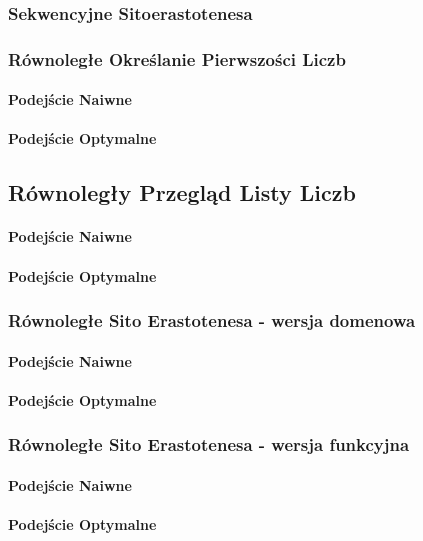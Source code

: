 \documentclass{article}
\begin{document}
            \subsubsection{Sekwencyjne Sitoerastotenesa}
            \subsubsection{Równoległe Określanie Pierwszości Liczb}
                \paragraph{Podejście Naiwne}
                \paragraph{Podejście Optymalne}
            \subsection{Równoległy Przegląd Listy Liczb}
                \paragraph{Podejście Naiwne}
                \paragraph{Podejście Optymalne}
            \subsubsection{Równoległe Sito Erastotenesa - wersja domenowa}
                \paragraph{Podejście Naiwne}
                \paragraph{Podejście Optymalne}
                \subsubsection{Równoległe Sito Erastotenesa - wersja funkcyjna}
                \paragraph{Podejście Naiwne}
                \paragraph{Podejście Optymalne}
    
\end{document}
